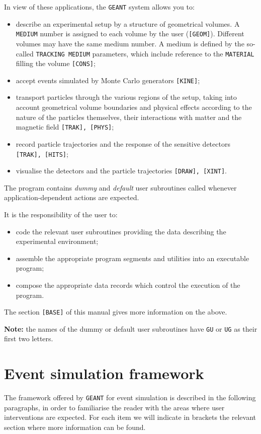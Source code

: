 In view of these applications, the {\tt GEANT} system allows you to:
\begin{itemize}
\item
describe an experimental setup
by a structure of geometrical volumes.
A {\tt MEDIUM} number 
is assigned to each volume
by the user ({\tt [GEOM]}). Different volumes may have
the same medium number. A medium is defined by
the so-called {\tt TRACKING MEDIUM} parameters, which
include reference to the {\tt MATERIAL}
filling the volume {\tt [CONS]};
\item
accept events simulated by Monte Carlo generators {\tt [KINE]};
\item transport particles through the various
regions of the setup, taking
into account geometrical volume boundaries and
physical effects according to the nature of the
particles themselves, their interactions
with matter and the magnetic field {\tt [TRAK], [PHYS]};
\item
record particle trajectories and the response of
the sensitive detectors {\tt [TRAK], [HITS]};
\item visualise the
detectors and the particle trajectories {\tt [DRAW], [XINT]}.
\end{itemize}

The program contains {\it dummy} and {\it default}
user subroutines called whenever application-dependent
actions are expected.

It is the responsibility of the user to:
\begin{itemize}
\item code the relevant user subroutines providing the data describing the
experimental environment;
\item assemble the appropriate program segments and utilities into an 
executable program;
\item compose the appropriate data records
which control the execution of the program. 
\end{itemize}
The
section {\tt [BASE]} of this manual gives more information on the above.

{\bf Note:}
the names of the dummy or default user subroutines have {\tt GU} or {\tt UG} 
as their first two letters.
 
\section{Event simulation framework}

The framework offered by {\tt GEANT} for event simulation is described in
the following paragraphs, in order
to familiarise the reader with the areas where user
interventions are expected.
For each item we will indicate in brackets the relevant section where more
information can be found.

